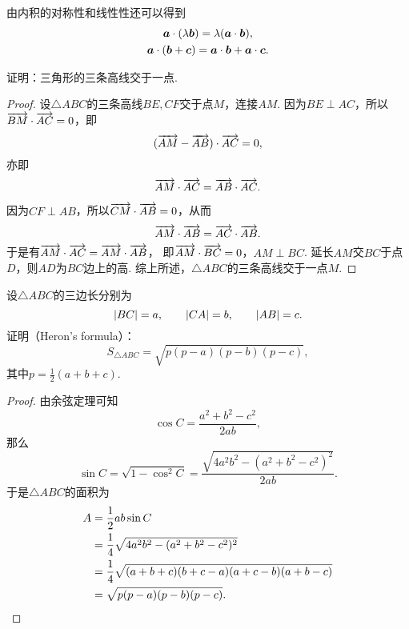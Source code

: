由内积的对称性和线性性还可以得到\begin{gather*}
	\boldsymbol{a}\cdot(\lambda\boldsymbol{b})
	= \lambda(\boldsymbol{a}\cdot\boldsymbol{b}), \\
	\boldsymbol{a}\cdot(\boldsymbol{b}+\boldsymbol{c})
	= \boldsymbol{a}\cdot\boldsymbol{b}
	+ \boldsymbol{a}\cdot\boldsymbol{c}.
\end{gather*}

\begin{example}
证明：三角形的三条高线交于一点.
\begin{proof}
设\(\triangle ABC\)的三条高线\(BE,CF\)交于点\(M\)，连接\(AM\).
因为\(BE \perp AC\)，所以\(\overrightarrow{BM}\cdot\overrightarrow{AC}=0\)，即\begin{equation*}
	(\overrightarrow{AM}-\overrightarrow{AB})\cdot\overrightarrow{AC}=0,
\end{equation*}
亦即\begin{equation*}
	\overrightarrow{AM}\cdot\overrightarrow{AC}=\overrightarrow{AB}\cdot\overrightarrow{AC}.
\end{equation*}

因为\(CF \perp AB\)，所以\(\overrightarrow{CM}\cdot\overrightarrow{AB}=0\)，从而\begin{equation*}
	\overrightarrow{AM}\cdot\overrightarrow{AB}=\overrightarrow{AC}\cdot\overrightarrow{AB}.
\end{equation*}
于是有\(\overrightarrow{AM}\cdot\overrightarrow{AC}=\overrightarrow{AM}\cdot\overrightarrow{AB}\)，
即\(\overrightarrow{AM}\cdot\overrightarrow{BC}=0\)，\(AM \perp BC\).
延长\(AM\)交\(BC\)于点\(D\)，则\(AD\)为\(BC\)边上的高.
综上所述，\(\triangle ABC\)的三条高线交于一点\(M\).
\end{proof}
\end{example}

\begin{example}
设\(\triangle ABC\)的三边长分别为\begin{equation*}
	\abs{BC} = a, \qquad
	\abs{CA} = b, \qquad
	\abs{AB} = c.
\end{equation*}
证明（Heron's formula）：\begin{equation}
	S_{\triangle ABC}
	= \sqrt{p (p-a) (p-b) (p-c)},
\end{equation}
其中\(p = \frac12(a+b+c)\).
\begin{proof}
由余弦定理可知\begin{equation*}
	\cos C = \frac{a^2+b^2-c^2}{2ab},
\end{equation*}
那么\begin{equation*}
	\sin C = \sqrt{1 - \cos^2 C}
	= \frac{\sqrt{4a^2b^2 - (a^2+b^2-c^2)^2}}{2ab}.
\end{equation*}
于是\(\triangle ABC\)的面积为\begin{align*}
	A &= \frac12 a b \sin C \\
	&= \frac14 \sqrt{4a^2b^2 - (a^2+b^2-c^2)^2} \\
	&= \frac14 \sqrt{(a+b+c)(b+c-a)(a+c-b)(a+b-c)} \\
	&= \sqrt{p (p-a) (p-b) (p-c)}.
	\qedhere
\end{align*}
\end{proof}
\end{example}

